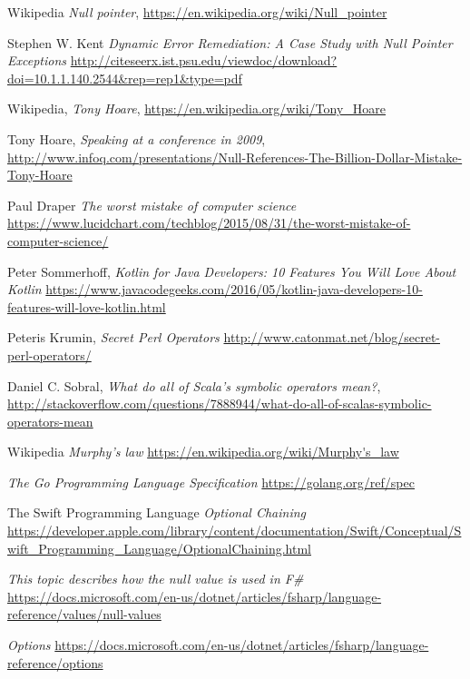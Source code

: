 \documentclass[a4paper,12pt]{report}
\begin{document}
\begin{thebibliography}{10}
	
    Wikipedia
    \textit{Null pointer},
    \url{https://en.wikipedia.org/wiki/Null_pointer}

    Stephen W. Kent
    \textit{Dynamic Error Remediation: A Case Study with Null Pointer Exceptions}
    \url{http://citeseerx.ist.psu.edu/viewdoc/download?doi=10.1.1.140.2544&rep=rep1&type=pdf}

	Wikipedia,
	\textit{Tony Hoare},
	\url{https://en.wikipedia.org/wiki/Tony_Hoare}
	
	Tony Hoare,
	\textit{Speaking at a conference in 2009},
	\url{http://www.infoq.com/presentations/Null-References-The-Billion-Dollar-Mistake-Tony-Hoare}

    Paul Draper
    \textit{The worst mistake of computer science}
    \url{https://www.lucidchart.com/techblog/2015/08/31/the-worst-mistake-of-computer-science/}

 	Peter Sommerhoff,
 	\textit{Kotlin for Java Developers: 10 Features You Will Love About Kotlin}
 	\url{https://www.javacodegeeks.com/2016/05/kotlin-java-developers-10-features-will-love-kotlin.html}

	Peteris Krumin,
	\textit{Secret Perl Operators}
	\url{http://www.catonmat.net/blog/secret-perl-operators/}

	Daniel C. Sobral,
	\textit{What do all of Scala's symbolic operators mean?},
	\url{http://stackoverflow.com/questions/7888944/what-do-all-of-scalas-symbolic-operators-mean}
	
    Wikipedia
    \textit{Murphy's law}
    \url{https://en.wikipedia.org/wiki/Murphy's_law}

    \textit{The Go Programming Language Specification}
    \url{https://golang.org/ref/spec}
    
    
    The Swift Programming Language
    \textit{Optional Chaining}
    \url{https://developer.apple.com/library/content/documentation/Swift/Conceptual/Swift_Programming_Language/OptionalChaining.html}
    
    \textit{This topic describes how the null value is used in F\#}
    \url{https://docs.microsoft.com/en-us/dotnet/articles/fsharp/language-reference/values/null-values}
    
    \textit{Options}
    \url{https://docs.microsoft.com/en-us/dotnet/articles/fsharp/language-reference/options}
    
\end{thebibliography}
\end{document}
